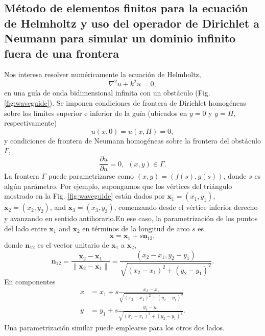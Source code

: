 \documentclass[11pt]{article}
\begin{document}
\subsection{Método de elementos finitos para la ecuación de Helmholtz y uso del operador de Dirichlet a Neumann para simular un dominio infinito fuera de una frontera}
Nos interesa resolver numéricamente la ecuación de Helmholtz,
\begin{equation}
  \label{eq:9}
  \nabla^2 u + k^2u = 0,
\end{equation}
en una guía de onda bidimensional infinita con un obstáculo (Fig. \ref{fig:waveguide}). Se imponen condiciones de frontera de Dirichlet homogéneas sobre los límites superior e inferior de la guía (ubicados en $y=0$ y $y=H$, respectivamente)
\begin{equation}
  \label{eq:10}
  u(x,0) = u(x,H) = 0,
\end{equation}
y condiciones de frontera de Neumann homogéneas sobre la frontera del obstáculo $\Gamma$,
\begin{equation}
  \label{eq:11}
  \frac{\partial u}{\partial n} = 0,~~(x,y) \in \Gamma.
\end{equation}
La frontera $\Gamma$ puede parametrizarse como $(x,y) = (f(s), g(s))$, donde $s$ es algún parámetro. Por ejemplo, supongamos que los vértices del triángulo mostrado en la Fig. \ref{fig:waveguide} están dados por $\mathbf{x}_1 = (x_1, y_1)$, $\mathbf{x}_2 = (x_2, y_2)$, and $\mathbf{x}_3 = (x_3,y_3)$, comenzando desde el vértice inferior derecho y avanzando en sentido antihorario.En ese caso, la parametrización de los puntos del lado entre $\mathbf{x}_1$ and $\mathbf{x}_2$ en términos de la longitud de arco $s$ es
\begin{equation}
  \label{eq:15}
  \mathbf{x} = \mathbf{x}_1 + s\mathbf{n}_{12},
\end{equation}
donde $\mathbf{n}_{12}$ es el vector unitario de $\mathbf{x}_1$ a $\mathbf{x}_2$,
\begin{equation}
  \label{eq:26}
  \mathbf{n}_{12} = \frac{\mathbf{x}_2 - \mathbf{x}_1}{\|\mathbf{x}_2 - \mathbf{x}_1\|} =
  \frac{(x_2 - x_1, y_2 - y_1)}{\sqrt{(x_2 - x_1)^2 + (y_2 - y_1)^2}}.
\end{equation}
En componentes
\begin{align}
  x &= x_1 + s \frac{x_2 - x_1}{\sqrt{(x_2 - x_1)^2 + (y_2 - y_1)^2}} \\
  y &= y_1 + s \frac{y_2 - y_1}{\sqrt{(x_2 - x_1)^2 + (y_2 - y_1)^2}}.
\end{align}
Una parametrización similar puede emplearse para los otros dos lados.
\end{document}
